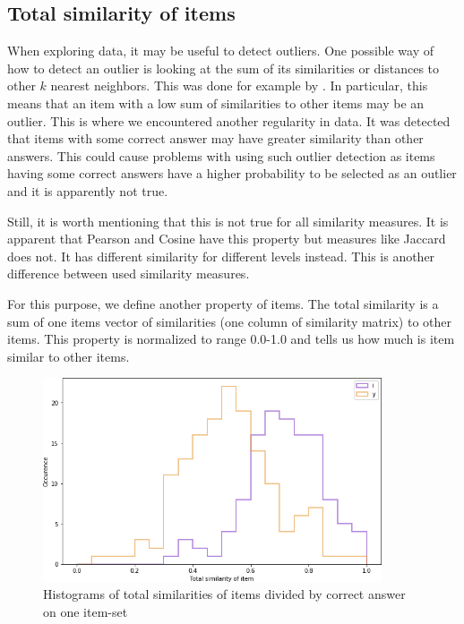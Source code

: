 \documentclass[
  digital, %
  table,   %
  nolof,     %
  nolot,     %
  nocover,
  color,
  final, %
]{fithesis3}
\begin{document}

\subsection{Total similarity of items}\label{total-similarity-of-items}

When exploring data, it may be useful to detect outliers. One possible way of how to detect an outlier is looking at the sum of its similarities or distances to other $k$ nearest neighbors. This was done for example by \citeauthor{mitchell2014survey}\cite{mitchell2014survey}. In particular, this means that an item with a low sum of similarities to other items may be an outlier. This is where we encountered another regularity in data. It was detected that items with some correct answer may have greater similarity than other answers. This could cause problems with using such outlier detection as items having some correct answers have a higher probability to be selected as an outlier and it is apparently not true.

Still, it is worth mentioning that this is not true for all similarity measures. It is apparent that Pearson and Cosine have this property but measures like Jaccard does not. It has different similarity for different levels instead. This is another difference between used similarity measures.

For this purpose, we define another property of items. The total similarity is a sum of one items vector of similarities (one column of similarity matrix) to other items. This property is normalized to range 0.0-1.0 and tells us how much is item similar to other items.

\begin{figure}
  \includegraphics[width=10cm]{img/histogram_i_y}
  \caption{Histograms of total similarities of items divided by correct answer on one item-set}
  \label{fig:histogram_i_y}
\end{figure}
\end{document}
